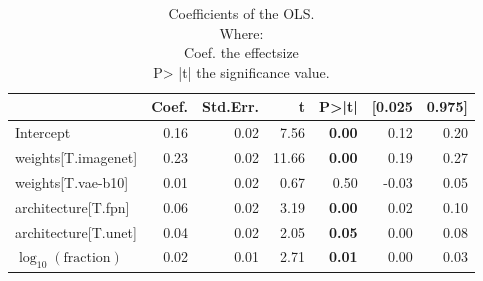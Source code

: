 \begin{table}[ht]
\caption{Coefficients of the OLS.\\Where:\\\hphantom{tabb}Coef. the effectsize\\\hphantom{tabb}P> |t| the significance value.}
\label{tab:data_fraction_parameter_influence}
\begin{tabular}{lrrrrrr}
\toprule
 & Coef. & Std.Err. & t & P>|t| & [0.025 & 0.975] \\
\midrule
Intercept & 0.16 & 0.02 & 7.56 & \textbf{0.00} & 0.12 & 0.20 \\
weights[T.imagenet] & 0.23 & 0.02 & 11.66 & \textbf{0.00} & 0.19 & 0.27 \\
weights[T.vae-b10] & 0.01 & 0.02 & 0.67 & 0.50 & -0.03 & 0.05 \\
architecture[T.fpn] & 0.06 & 0.02 & 3.19 & \textbf{0.00} & 0.02 & 0.10 \\
architecture[T.unet] & 0.04 & 0.02 & 2.05 & \textbf{0.05} & 0.00 & 0.08 \\
$\log_{10}(\text{fraction})$ & 0.02 & 0.01 & 2.71 & \textbf{0.01} & 0.00 & 0.03 \\
\bottomrule
\end{tabular}
\end{table}
